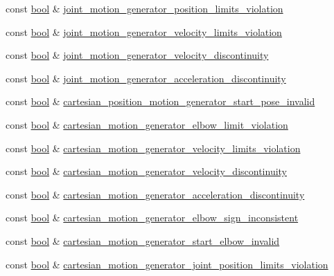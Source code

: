 \begin{DoxyCompactItemize}
\item 
const \hyperlink{classbool}{bool} \& \hyperlink{structfranka_1_1Errors_a9536ad072868b90525c56143cbb956ef}{joint\+\_\+motion\+\_\+generator\+\_\+position\+\_\+limits\+\_\+violation}
\item 
const \hyperlink{classbool}{bool} \& \hyperlink{structfranka_1_1Errors_ae211638df9b0e23905c8a9d36e249207}{joint\+\_\+motion\+\_\+generator\+\_\+velocity\+\_\+limits\+\_\+violation}
\item 
const \hyperlink{classbool}{bool} \& \hyperlink{structfranka_1_1Errors_abd6da8e6a32d817a7b4848a24efd9379}{joint\+\_\+motion\+\_\+generator\+\_\+velocity\+\_\+discontinuity}
\item 
const \hyperlink{classbool}{bool} \& \hyperlink{structfranka_1_1Errors_a633195adca91f5ecaf1506da12f3311f}{joint\+\_\+motion\+\_\+generator\+\_\+acceleration\+\_\+discontinuity}
\item 
const \hyperlink{classbool}{bool} \& \hyperlink{structfranka_1_1Errors_aa910fad4992b91be1ea1c321ee9b7a1e}{cartesian\+\_\+position\+\_\+motion\+\_\+generator\+\_\+start\+\_\+pose\+\_\+invalid}
\item 
const \hyperlink{classbool}{bool} \& \hyperlink{structfranka_1_1Errors_ac21ebdc1e0e8fb3099a7dce284550c4c}{cartesian\+\_\+motion\+\_\+generator\+\_\+elbow\+\_\+limit\+\_\+violation}
\item 
const \hyperlink{classbool}{bool} \& \hyperlink{structfranka_1_1Errors_a91437c081452ef708563346b102ba894}{cartesian\+\_\+motion\+\_\+generator\+\_\+velocity\+\_\+limits\+\_\+violation}
\item 
const \hyperlink{classbool}{bool} \& \hyperlink{structfranka_1_1Errors_a17e4a9b6b7dc4cc12c1328d36cac3eaf}{cartesian\+\_\+motion\+\_\+generator\+\_\+velocity\+\_\+discontinuity}
\item 
const \hyperlink{classbool}{bool} \& \hyperlink{structfranka_1_1Errors_a10c6ac36bf48b4a9edf91e74d9bc4837}{cartesian\+\_\+motion\+\_\+generator\+\_\+acceleration\+\_\+discontinuity}
\item 
const \hyperlink{classbool}{bool} \& \hyperlink{structfranka_1_1Errors_a58b0e1199c9dded5a32bfeb110e63037}{cartesian\+\_\+motion\+\_\+generator\+\_\+elbow\+\_\+sign\+\_\+inconsistent}
\item 
const \hyperlink{classbool}{bool} \& \hyperlink{structfranka_1_1Errors_a6d905b803bbe8a7be8490f2a94ba524a}{cartesian\+\_\+motion\+\_\+generator\+\_\+start\+\_\+elbow\+\_\+invalid}
\item 
const \hyperlink{classbool}{bool} \& \hyperlink{structfranka_1_1Errors_a73aef7473fd6d1d5b207e68fa35948c5}{cartesian\+\_\+motion\+\_\+generator\+\_\+joint\+\_\+position\+\_\+limits\+\_\+violation}

\end{DoxyCompactItemize}
